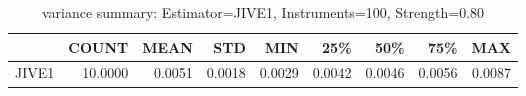 \begin{table}[ht]
\centering
\caption{variance summary: Estimator=JIVE1, Instruments=100, Strength=0.80}
\begin{tabular}{lrrrrrrrr}
\toprule
 & COUNT & MEAN & STD & MIN & 25\% & 50\% & 75\% & MAX \\
\midrule
JIVE1 & 10.0000 & 0.0051 & 0.0018 & 0.0029 & 0.0042 & 0.0046 & 0.0056 & 0.0087 \\
\bottomrule
\end{tabular}
\end{table}
